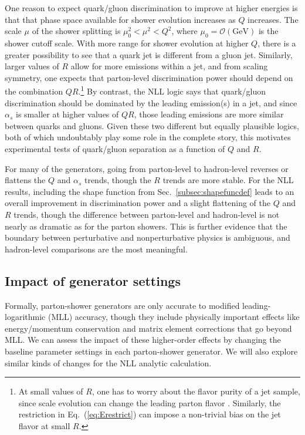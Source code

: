 \documentclass[11pt,letterpaper]{article}
\newcommand{\GeV}{\text{GeV}}
\DeclareRobustCommand{\Sec}[1]{Sec.~\ref{#1}}
\DeclareRobustCommand{\Eq}[1]{Eq.~(\ref{#1})}
\begin{document}
One reason to expect quark/gluon discrimination to improve at higher energies is that that phase space available for shower evolution increases as $Q$ increases.  The scale $\mu$ of the shower splitting is $\mu_0^2 < \mu^2 < Q^2$, where $\mu_0 = \mathcal{O}(\GeV)$ is the shower cutoff scale.  With more range for shower evolution at higher $Q$, there is a greater possibility to see that a quark jet is different from a gluon jet.  Similarly, larger values of $R$ allow for more emissions within a jet, and from scaling symmetry, one expects that parton-level discrimination power should depend on the combination $Q R$.\footnote{At small values of $R$, one has to worry about the flavor purity of a jet sample, since scale evolution can change the leading parton flavor \cite{Dasgupta:2014yra,Dasgupta:2016bnd}.  Similarly, the restriction in \Eq{eq:Erestrict} can impose a non-trivial bias on the jet flavor at small $R$.}  By contrast, the NLL logic says that quark/gluon discrimination should be dominated by the leading emission(s) in a jet, and since $\alpha_s$ is smaller at higher values of $Q R$, those leading emissions are more similar between quarks and gluons.  Given these two different but equally plausible logics, both of which undoubtably play some role in the complete story, this motivates experimental tests of quark/gluon separation as a function of $Q$ and $R$.

For many of the generators, going from parton-level to hadron-level reverses
or flattens the $Q$ and $\alpha_s$ trends, though the $R$ trends are more
stable.  For the NLL results, including the shape function from
\Sec{subsec:shapefuncdef} leads to an overall improvement in discrimination
power and a slight flattening of the $Q$ and $R$ trends, though the
difference between parton-level and hadron-level is not nearly as dramatic as
for the parton showers.  This is further evidence that the boundary between perturbative and nonperturbative physics is ambiguous, and hadron-level comparisons are the most meaningful. 

\subsection{Impact of generator settings}
\label{sec:ee_settings}

Formally, parton-shower generators are only accurate to modified leading-logarithmic (MLL) accuracy, though they include physically important effects like energy/momentum conservation and matrix element corrections that go beyond MLL.  We can assess the impact of these higher-order effects by changing the baseline parameter settings in each parton-shower generator.  We will also explore similar kinds of changes for the NLL analytic calculation.
\end{document}
